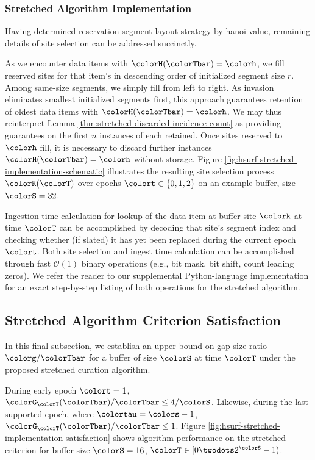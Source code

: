 \subsubsection{Stretched Algorithm Implementation}
\label{sec:stretched-implementation}

Having determined reservation segment layout strategy by hanoi value, remaining details of site selection can be addressed succinctly.

As we encounter data items with $\colorH(\colorTbar) = \colorh$, we fill reserved sites for that item's \hv{} in descending order of initialized segment size $r$.
Among same-size segments, we simply fill from left to right.
As invasion eliminates smallest initialized segments first, this approach guarantees retention of oldest data items with $\colorH(\colorTbar) = \colorh$.
We may thus reinterpret Lemma \ref{thm:stretched-discarded-incidence-count} as providing guarantees on the first $n$ instances of each \hv{} retained.
Once sites reserved to \hv{} $\colorh$ fill, it is necessary to discard further instances $\colorH(\colorTbar) = \colorh$ without storage.
Figure \ref{fig:hsurf-stretched-implementation-schematic} illustrates the resulting site selection process $\colorK(\colorT)$ over epochs $\colort \in \{0,1,2\}$ on an example buffer, size $\colorS=32$.

Ingestion time calculation for lookup of the data item at buffer site $\colork$ at time $\colorT$ can be accomplished by decoding that site's segment index and checking whether (if slated) it has yet been replaced during the current epoch $\colort$.
Both site selection and ingest time calculation can be accomplished through fast $\mathcal{O}(1)$ binary operations (e.g., bit mask, bit shift, count leading zeros).
We refer the reader to our supplemental Python-language implementation for an exact step-by-step listing of both operations for the stretched algorithm.

\subsection{Stretched Algorithm Criterion Satisfaction}
\label{sec:stretched-satisfaction}

In this final subsection, we establish an upper bound on gap size ratio $\colorg / \colorTbar$ for a buffer of size $\colorS$ at time $\colorT$ under the proposed stretched curation algorithm.



During early epoch $\colort = 1$, $\colorG_{\colorT}(\colorTbar)/\colorTbar \leq 4/\colorS$.
Likewise, during the last supported epoch, where $\colortau = \colors - 1$, $\colorG_{\colorT}(\colorTbar)/\colorTbar \leq 1$.
Figure \ref{fig:hsurf-stretched-implementation-satisfaction} shows algorithm performance on the stretched criterion for buffer size $\colorS=16$, $\colorT \in [0\twodots 2^{\colorS} - 1)$.
